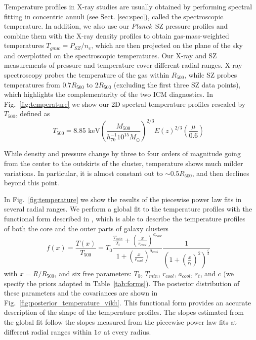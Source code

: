 \documentclass[traditabstract   ]{aa} %
\newcommand{\planck}{{\it Planck}}
\begin{document}
Temperature profiles in X-ray studies are usually obtained by performing spectral fitting in concentric annuli (see Sect. \ref{sec:spec}),  called the spectroscopic temperature. In addition, we also use our \planck\ SZ pressure profiles and combine them with the X-ray density profiles to obtain gas-mass-weighted temperatures $T_{gmw}=P_{SZ}/n_{e}$, which are then projected \citep[using the X-ray emissivity as weight, as in ][]{mazzotta+04} on the plane of the sky and overplotted  on the spectroscopic temperatures. Our X-ray and SZ measurements of pressure and temperature cover different radial ranges. X-ray spectroscopy probes the temperature of the gas within $R_{500}$, while SZ probes temperatures from $0.7 R_{500}$ to $2R_{500}$ (excluding the first three SZ data points), which highlights the complementarity of the two ICM diagnostics.
In Fig.~\ref{fig:temperature} we show our 2D spectral temperature profiles rescaled by $T_{500}$, defined as
\begin{equation}
T_{500} = 8.85 \text{\ keV} \left(\frac{ M_{500} }{ h_{70}^{-1} 10^{15} M_\odot } \right)^{2/3} E(z)^{2/3} \left( \frac{\mu}{0.6} \right)
\label{eq:T500}
\end{equation}

While density and pressure change by three to four orders of magnitude going from the center to the outskirts of the cluster, temperature shows much milder variations. In particular, it is almost constant out to $\sim0.5 R_{500}$, and then declines beyond this point.  

In Fig.~\ref{fig:temperature} we show the results of the piecewise power law fits in several radial ranges. We perform a global fit to the temperature profiles with the functional form described in \citet{vikhlini+06}, which is able to describe the temperature profiles of both the core and the outer parts of galaxy clusters
\begin{equation}
f(x) = \frac{T(x)}{T_{500}}  = T_0 \frac{\frac{T_{min}}{T_0} + \left( \frac{x}{r_{cool}} \right)^{a_{cool}}}{1+\left( \frac{x}{r_{cool}} \right)^{a_{cool}}}\frac{1}{\left(1+\left( \frac{x}{r_t} \right)^2 \right)^{\frac{c}{2}}}
\label{eq:vikh_temperature}
\end{equation}
with $x = R/R_{500}$, and six free parameters: $T_0$, $T_{min}$, $r_{cool}$, $a_{cool}$, $r_t$, and $c$ (we specify the priors adopted in Table~\ref{tab:forms}). The posterior distribution of these parameters and the covariances are shown in Fig.~\ref{fig:posterior_temperature_vikh}. This functional form provides an accurate description of the shape of the temperature profiles. The slopes estimated from the global fit follow the slopes measured from the piecewise power law fits at different radial ranges within $1\sigma$ at every radius. 
\end{document}
